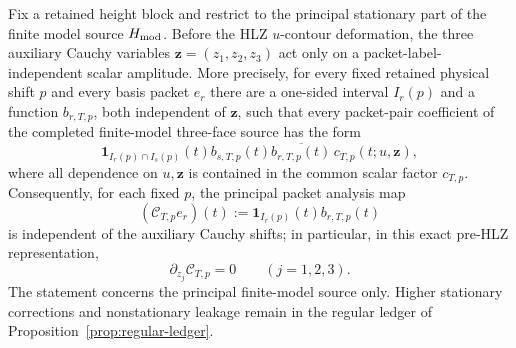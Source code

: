 \begin{lemma}
\label{lem:aux-shift-rigidity-packet-map}
Fix a retained height block and restrict to the principal stationary part of the
finite model source $H_{\rm mod}$.  Before the HLZ $u$-contour deformation, the
three auxiliary Cauchy variables $\mathbf z=(z_1,z_2,z_3)$ act only on a
packet-label-independent scalar amplitude.  More precisely, for every fixed
retained physical shift $p$ and every basis packet $e_r$ there are a one-sided
interval $I_r(p)$ and a function $b_{r,T,p}$, both independent of $\mathbf z$,
such that every packet-pair coefficient of the completed finite-model
three-face source has the form
\begin{equation}
\boxed{
\mathbf 1_{I_r(p)\cap I_s(p)}(t)
 b_{s,T,p}(t)\overline{b_{r,T,p}(t)}\,
 c_{T,p}(t;u,\mathbf z),
}
\label{eq:preHLZ-shift-rigid-factorization}
\end{equation}
where all dependence on $u,\mathbf z$ is contained in the common scalar factor
$c_{T,p}$.  Consequently, for each fixed $p$, the principal packet analysis map
\[
(\mathscr C_{T,p}e_r)(t):=\mathbf 1_{I_r(p)}(t)b_{r,T,p}(t)
\]
is independent of the auxiliary Cauchy shifts; in particular, in this exact
pre-HLZ representation,
\begin{equation}
\boxed{\partial_{z_j}\mathscr C_{T,p}=0\qquad(j=1,2,3).}
\label{eq:C-map-shift-rigidity}
\end{equation}
The statement concerns the principal finite-model source only.  Higher
stationary corrections and nonstationary leakage remain in the regular ledger
of Proposition~\ref{prop:regular-ledger}.
\end{lemma}

